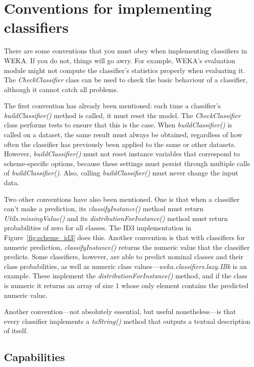 \section{Conventions for implementing classifiers}
\label{subsec:conventions}

There are some conventions that you must obey when implementing
classifiers in WEKA. If you do not, things will go awry. For example,
WEKA's evaluation module might not compute the classifier's statistics
properly when evaluating it. The \textit{CheckClassifier} class can be used to
check the basic behaviour of a classifier, although it cannot catch
all problems.

The first convention has already been mentioned: each time a
classifier's \textit{buildClassifier()} method is called, it must reset the
model. The \textit{CheckClassifier} class performs tests to ensure that this is
the case. When \textit{buildClassifier()} is called on a dataset, the same
result must always be obtained, regardless of how often the classifier
has previously been applied to the same or other datasets. However,
\textit{buildClassifier()} must not reset instance variables that correspond to
scheme-specific options, because these settings must persist through
multiple calls of \textit{buildClassifier()}. Also,
calling \textit{buildClassifier()} must never change the input data.

Two other conventions have also been mentioned. One is that when a
classifier can't make a prediction, its \textit{classifyInstance()}
method must return \textit{Utils.missingValue()} and
its \textit{distributionForInstance()} method must return
probabilities of zero for all classes. The ID3 implementation in
Figure~\ref{fig:scheme_id3} does this. Another convention is that with
classifiers for numeric prediction, \textit{classifyInstance()}
returns the numeric value that the classifier predicts. Some
classifiers, however, are able to predict nominal classes and their
class probabilities, as well as numeric class
values---\textit{weka.classifiers.lazy.IBk} is an example. These implement the
\textit{distributionForInstance()} method, and if the class is numeric it
returns an array of size 1 whose only element contains the predicted
numeric value.

Another convention---not absolutely essential, but useful
nonetheless---is that every classifier implements
a \textit{toString()} method that outputs a textual description of
itself.

\subsection{Capabilities}

